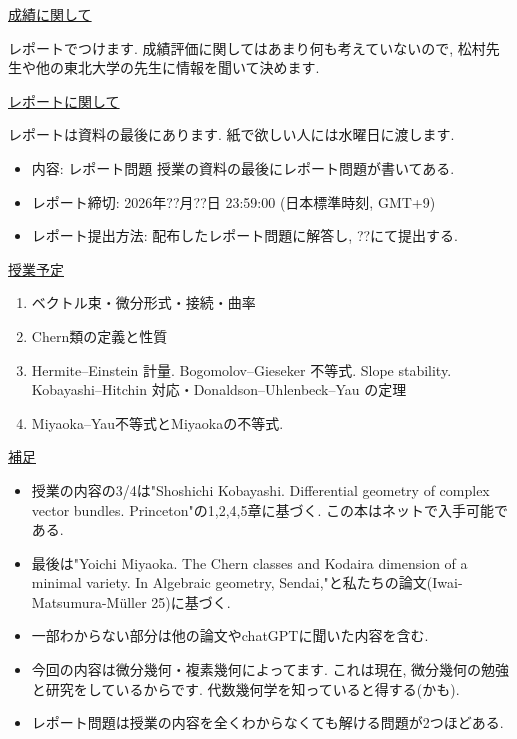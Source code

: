 \documentclass[dvipdfmx,a4paper,11pt]{article} %
\theoremstyle{definition}
\theoremstyle{remark}
\numberwithin{equation}{section}
\begin{document}
{\Large \underline{成績に関して}}

レポートでつけます. 成績評価に関してはあまり何も考えていないので, 松村先生や他の東北大学の先生に情報を聞いて決めます.


\medskip
{\Large \underline{レポートに関して}}

レポートは資料の最後にあります. 紙で欲しい人には水曜日に渡します. 
\begin{itemize}
  \setlength{\parskip}{0cm} 
  \setlength{\itemsep}{0cm}
\item 内容: レポート問題 授業の資料の最後にレポート問題が書いてある.
\item レポート締切: 2026年??月??日 23:59:00 (日本標準時刻, GMT+9)
\item レポート提出方法: 配布したレポート問題に解答し, ??にて提出する. 
\end{itemize}

{\Large \underline{授業予定}}

\begin{enumerate}
  \setlength{\parskip}{0cm} 
  \setlength{\itemsep}{0cm}
\item ベクトル束・微分形式・接続・曲率 
\item Chern類の定義と性質
\item Hermite--Einstein 計量. Bogomolov--Gieseker 不等式. Slope stability. Kobayashi--Hitchin 対応・Donaldson--Uhlenbeck--Yau の定理
\item Miyaoka--Yau不等式とMiyaokaの不等式. 
\end{enumerate}


{\Large \underline{補足}}

\begin{itemize}
  \setlength{\parskip}{0cm} 
  \setlength{\itemsep}{0cm}
\item 授業の内容の3/4は"Shoshichi Kobayashi. Differential geometry of complex vector bundles. Princeton"の1,2,4,5章に基づく. この本はネットで入手可能である. 
\item 最後は"Yoichi Miyaoka. The Chern classes and Kodaira dimension of a minimal variety. In Algebraic geometry, Sendai,"と私たちの論文(Iwai-Matsumura-Müller 25)に基づく. 
\item 一部わからない部分は他の論文やchatGPTに聞いた内容を含む. 
\item 今回の内容は微分幾何・複素幾何によってます.  これは現在, 微分幾何の勉強と研究をしているからです. 代数幾何学を知っていると得する(かも). 
\item レポート問題は授業の内容を全くわからなくても解ける問題が2つほどある. 
\end{itemize}
\end{document}
